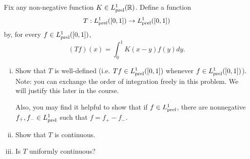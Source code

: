 \documentclass[11pt,letterpaper]{article}
\newcommand{\R}{\mathbb{R}}
\newcommand{\prel}{{\rm prel}}
\newenvironment{prob}[1]
  {\renewcommand\theinnerprob{#1}\innerprob}
  {\endinnerprob}
\begin{document}
\begin{prob}{4} %
Fix any non-negative function $K \in L_\prel^1(\R)$.  Define a function
\[
	T: L_\prel^1([0,1]) \to L_\prel^1([0,1])
\]
by, for every $f \in L_\prel^1([0,1])$,
\[
	(Tf)(x) = \int_0^1 K(x-y) f(y) dy.
\]
\begin{enumerate}[(i)]
	\item Show that $T$ is well-defined (i.e. $Tf \in L_\prel^1([0,1])$ whenever $f\in L_{\rm prel}^1([0,1])$).  Note: you can exchange the order of integration freely in this problem.  We will justify this later in the course.
	
	Also, you may find it helpful to show that if $f\in L^1_{\rm prel}$, there are nonnegative $f_+, f_- \in L^1_{\rm prel}$ such that $f = f_+ - f_-$.
	
	\item Show that $T$ is continuous.  
	\item Is $T$ uniformly continuous?
\end{enumerate}
\end{prob}
\end{document}
